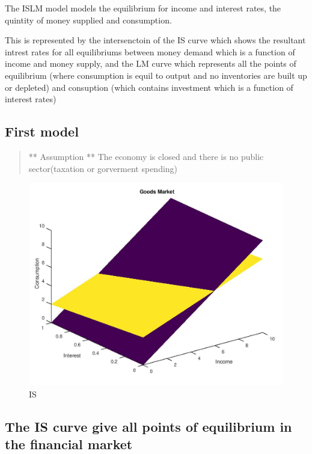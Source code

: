 \documentclass{tufte-book}
\begin{document}
The ISLM model models the equilibrium for income and interest rates, the
quintity of money supplied and consumption.

This is represented by the intersenctoin of the IS curve which shows the
resultant intrest rates for all equilibriums between money demand which
is a function of income and money supply, and the LM curve which
represents all the points of equilibrium (where consumption is equil to
output and no inventories are built up or depleted) and consuption
(which contains investment which is a function of interest rates)

\hypertarget{first-model}{%
\subsection{First model}\label{first-model}}

\begin{quote}
** Assumption ** The economy is closed and there is no public
sector(taxation or gorverment spending)
\end{quote}

\begin{figure}
\centering
\includegraphics[width=\textwidth,height=1\textwidth]{pics/LM.jpg}
\caption{IS}
\end{figure}

\hypertarget{the-is-curve-give-all-points-of-equilibrium-in-the-financial-market}{%
\subsection{The IS curve give all points of equilibrium in the financial
market}\label{the-is-curve-give-all-points-of-equilibrium-in-the-financial-market}}
\end{document}
